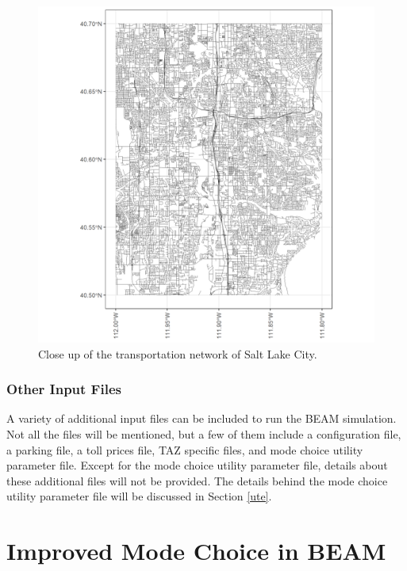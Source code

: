 \documentclass[12pt, oneside, openright]{byuthesis}
\begin{document}
\begin{figure}

{\centering \includegraphics[width=480px]{pics/smallnetwork} 

}

\caption{Close up of the transportation network of Salt Lake City.}\label{fig:closent}
\end{figure}

\hypertarget{other-input-files}{%
\subsubsection{Other Input Files}\label{other-input-files}}

A variety of additional input files can be included to run the BEAM simulation. Not all the files will be mentioned, but a few of them include a configuration file, a parking file, a toll prices file, TAZ specific files, and mode choice utility parameter file. Except for the mode choice utility parameter file, details about these additional files will not be provided. The details behind the mode choice utility parameter file will be discussed in Section \ref{ute}.

\hypertarget{mbeam}{%
\section{Improved Mode Choice in BEAM}\label{mbeam}}
\end{document}
